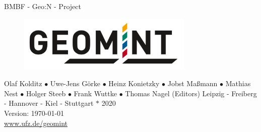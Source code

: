 
\begin{center}

\quad
\vspace{2cm}
\quad

\Huge
BMBF - Geo:N - Project
\\[3cm]
\begin{figure}[htbp]
\centering
\includegraphics[width=0.75\textwidth]{figures/geomint-logo}
\end{figure}
\vspace{2cm}
Olaf Kolditz $\bullet$ Uwe-Jens Görke $\bullet$ Heinz Konietzky $\bullet$ Jobst Maßmann $\bullet$ Mathias Nest $\bullet$ Holger Steeb $\bullet$ Frank Wuttke $\bullet$ Thomas Nagel (Editors)
\vfill
\Large
Leipzig - Freiberg - Hannover - Kiel - Stuttgart $\ast$ 2020
\\[1ex]
Version: \today
\\[1ex]
\url{www.ufz.de/geomint}
\end{center}
\normalsize
